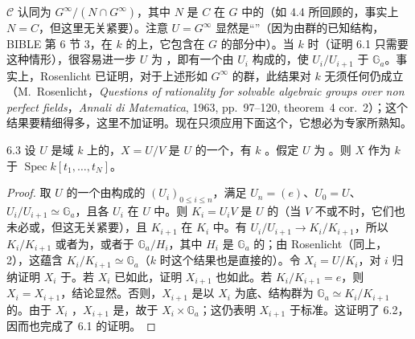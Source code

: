$\mathcal C$ 认同为 $G^\infty/(N\cap G^\infty)$，其中 $N$ 是 $C$ 在 $G$ 中的（如 4.4 所回顾的，事实上 $N=C$，但这里无关紧要）。注意 $U=G^\infty$ 显然是“”（因为由群的已知结构，BIBLE 第 6 节 3，在 $k$ 的上，它包含在 $G$ 的部分中）。当 $k$ 时（证明 6.1 只需要这种情形），很容易进一步 $U$ 为 ，即有一个由 $U_i$ 构成的，使 $U_i/U_{i+1}$ 于 $\mathbb G_a$。事实上，Rosenlicht 已证明，对于上述形如 $G^\infty$ 的群，此结果对 $k$ 无须任何仍成立（M.~Rosenlicht，\emph{Questions of rationality for solvable algebraic groups over non perfect fields}，\emph{Annali di Matematica}, 1963, pp.~97--120, theorem~4 cor.~2）；这个结果要精细得多，这里不加证明。现在只须应用下面这个，它想必为专家所熟知。
\begin{SGAresult}{}{6.3}
设 $U$ 是域 $k$ 上的，$X=U/V$ 是 $U$ 的一个，有 $k$ 。假定 $U$ 为 。则 $X$ 作为 $k$ 于 $\operatorname{Spec}k[t_1,\ldots,t_N]$。
\end{SGAresult}
\begin{proof}
取 $U$ 的一个由构成的 $(U_i)_{0\leq i\leq n}$，满足 $U_n=(e)$、$U_0=U$、$U_i/U_{i+1}\simeq\mathbb G_a$，且各 $U_i$ 在 $U$ 中。则 $K_i=U_iV$ 是 $U$ 的（当 $V$ 不或不时，它们也未必或，但这无关紧要），且 $K_{i+1}$ 在 $K_i$ 中。有 $U_i/U_{i+1}\to K_i/K_{i+1}$，所以 $K_i/K_{i+1}$ 或者为，或者于 $\mathbb G_a/H_i$，其中 $H_i$ 是 $\mathbb G_a$ 的；由 Rosenlicht（同上， 2），这蕴含 $K_i/K_{i+1}\simeq\mathbb G_a$（$k$ 时这个结果也是直接的）。令 $X_i=U/K_i$，对 $i$ 归纳证明 $X_i$ 于。若 $X_i$ 已如此，证明 $X_{i+1}$ 也如此。若 $K_i/K_{i+1}=e$，则 $X_i=X_{i+1}$，结论显然。否则，$X_{i+1}$ 是以 $X_i$ 为底、结构群为 $\mathbb G_a\simeq K_i/K_{i+1}$ 的。由于 $X_i$ ，$X_{i+1}$ 是，故于 $X_i\times\mathbb G_a$；这仍表明 $X_{i+1}$ 于标准。这证明了 6.2，因而也完成了 6.1 的证明。
\end{proof}

